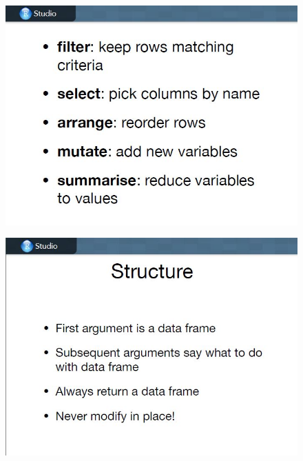 \documentclass{beamer}
\begin{document}
\begin{frame}
	\begin{figure}
		\centering
		\includegraphics[width=1.05\linewidth]{images/CG-dplyr6}
	\end{figure}
\end{frame}
\begin{frame}
	\begin{figure}
		\centering
		\includegraphics[width=1.05\linewidth]{images/CG-dplyr7}
	\end{figure}
\end{frame}
\end{document}
